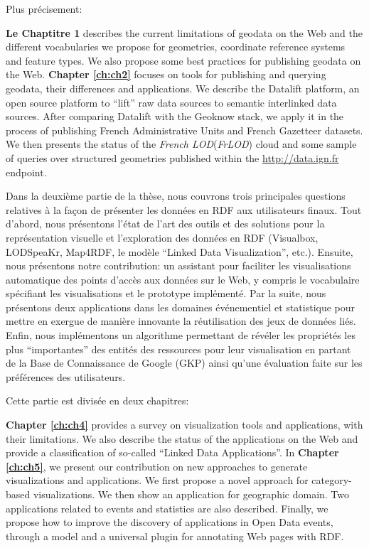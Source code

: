 \documentclass[a4paper,11pt,twoside]{report}
\begin{document}
Plus précisement:

 
  \textbf{Le Chaptitre 1} describes the current limitations of geodata on the Web and the different vocabularies we propose for geometries, coordinate reference systems and feature  types. We also propose  some best practices for publishing geodata on the Web.
 \textbf{Chapter \ref{ch:ch2}} focuses on tools for publishing and querying geodata, their differences and applications. We describe the Datalift platform, an open source platform to ``lift'' raw data sources to semantic interlinked data sources. After comparing Datalift with the Geoknow stack, we apply it in the process of publishing French Administrative Units and French Gazetteer datasets. We then presents the status of the \textit{French LOD}(\textit{FrLOD}) cloud and some sample of queries over structured geometries published within the \url{http://data.ign.fr} endpoint. 
 
 
 Dans la deuxième partie de la thèse, nous couvrons trois principales questions relatives à la façon de présenter les données en RDF aux utilisateurs finaux. Tout d'abord, nous présentons l'état de l'art des outils et des solutions pour la représentation visuelle et l'exploration des données en RDF (Visualbox, LODSpeaKr, Map4RDF, le modèle ``Linked Data Visualization'', etc.). Ensuite, nous présentons notre contribution: un assistant pour faciliter les visualisations automatique des points d'accès aux données sur le Web, y compris le vocabulaire spécifiant les visualisations et le prototype implémenté. Par la suite, nous présentons deux applications dans les domaines événementiel et statistique pour mettre en exergue de manière innovante la réutilisation des jeux de données liés. Enfin, nous implémentons un algorithme permettant de révéler les propriétés les plus ``importantes'' des entités des ressources pour leur visualisation en partant de la Base de Connaissance de Google (GKP) ainsi qu'une évaluation faite sur les préférences des utilisateurs. 
 
 Cette partie est divisée en deux chapitres:
 
 
  \textbf{Chapter \ref{ch:ch4}} provides a survey on visualization tools and applications, with their limitations. We also describe the status of the applications on the Web and provide a classification of so-called ``Linked Data Applications''.
   In \textbf{Chapter \ref{ch:ch5}}, we present our contribution on new approaches to generate visualizations and applications. We first propose a novel approach for category-based visualizations. We then show an application for geographic domain. Two applications related to events and statistics are also described. Finally, we propose how to improve the discovery of applications in Open Data events, through a model and a universal plugin for annotating Web pages with RDF. 
\end{document}
